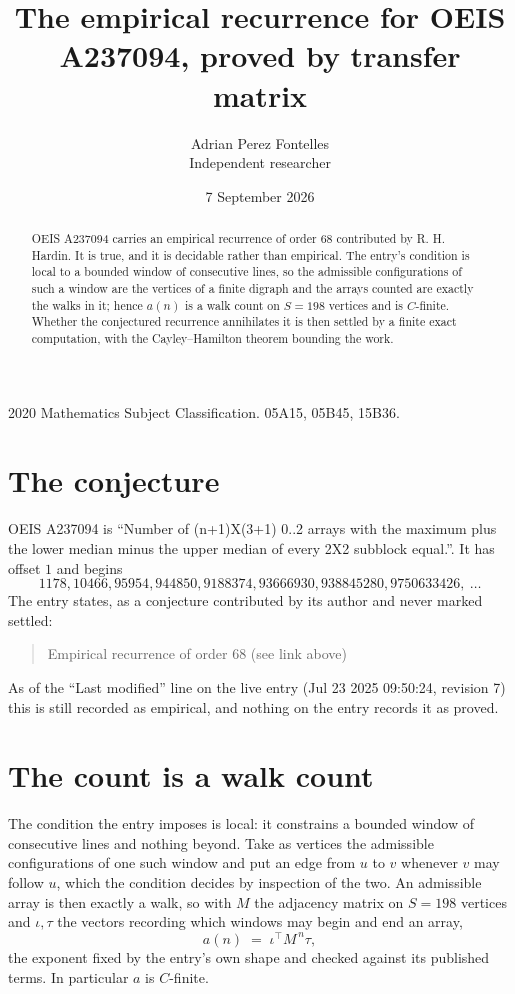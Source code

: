\documentclass[11pt,a4paper]{article}
\title{The empirical recurrence for OEIS A237094, proved by transfer matrix}
\author{Adrian Perez Fontelles\\ \small Independent researcher}
\date{7 September 2026}
\theoremstyle{plain}
\theoremstyle{definition}
\begin{document}
\maketitle

\begin{abstract}
OEIS A237094 carries an empirical recurrence of order $68$ contributed by R. H. Hardin. It is
true, and it is decidable rather than empirical. The entry's condition is local to a bounded window of consecutive lines, so
the admissible configurations of such a window are the vertices of a finite digraph and the
arrays counted are exactly the walks in it; hence $a(n)$ is a walk count on $S=198$ vertices
and is $C$-finite. Whether the conjectured recurrence annihilates it is then settled by a
finite exact computation, with the Cayley--Hamilton theorem bounding the work.
\end{abstract}

\noindent\small 2020 Mathematics Subject Classification. 05A15, 05B45, 15B36.\normalsize

\section{The conjecture}

OEIS A237094 is ``Number of (n+1)X(3+1) 0..2 arrays with the maximum plus the lower median minus the upper median of every 2X2 subblock equal.''. It has offset $1$ and begins
\[
1178, 10466, 95954, 944850, 9188374, 93666930, 938845280, 9750633426,\ \dots
\]
The entry states, as a conjecture contributed by its author and never marked settled:
\begin{quote}
Empirical recurrence of order 68 (see link above)
\end{quote}
As of the ``Last modified'' line on the live entry (Jul 23 2025 09:50:24, revision 7) this is still
recorded as empirical, and nothing on the entry records it as proved.

\section{The count is a walk count}

The condition the entry imposes is local: it constrains a bounded window of consecutive lines and nothing beyond. Take as
vertices the admissible configurations of one such window and put an edge from $u$ to $v$
whenever $v$ may follow $u$, which the condition decides by inspection of the two. An
admissible array is then exactly a walk, so with $M$ the adjacency matrix on $S=198$ vertices
and $\iota,\tau$ the vectors recording which windows may begin and end an array,
\[
a(n)\;=\;\iota^{\!\top}M^{\,n}\tau ,
\]
the exponent fixed by the entry's own shape and checked against its published terms. In
particular $a$ is $C$-finite.
\end{document}
